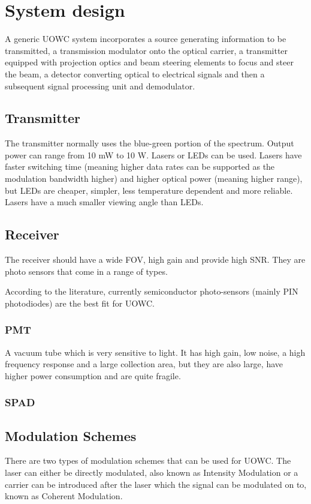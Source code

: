 \documentclass{article}
\begin{document}
\section{System design}
A generic \ac{UOWC} system incorporates a source generating information to be transmitted, a transmission modulator onto the optical carrier, a transmitter equipped with projection optics and beam steering elements to focus and steer the beam, a detector converting optical to electrical signals and then a subsequent signal processing unit and demodulator.

\subsection{Transmitter}
The transmitter normally uses the blue-green portion of the spectrum. Output power can range from 10 mW to 10 W. Lasers or \ac{LED}s can be used. Lasers have faster switching time (meaning higher data rates can be supported as the modulation bandwidth higher) and higher optical power (meaning higher range), but \ac{LED}s are cheaper, simpler, less temperature dependent and more reliable. Lasers have a much smaller viewing angle than \ac{LED}s.

\subsection{Receiver}
The receiver should have a wide \ac{FOV}, high gain and provide high \ac{SNR}. They are photo sensors that come in a range of types.

According to the literature, currently semiconductor photo-sensors (mainly \ac{PIN} photodiodes) are the best fit for \ac{UOWC}.

\subsubsection{\ac{PMT}}
A vacuum tube which is very sensitive to light. It has high gain, low noise, a high frequency response and a large collection area, but they are also large, have higher power consumption and are quite fragile.

\subsubsection{\ac{SPAD}}

\subsection{Modulation Schemes}
There are two types of modulation schemes that can be used for \ac{UOWC}. The laser can either be directly modulated, also known as Intensity Modulation or a carrier can be introduced after the laser which the signal can be modulated on to, known as Coherent Modulation.
 
\end{document}
